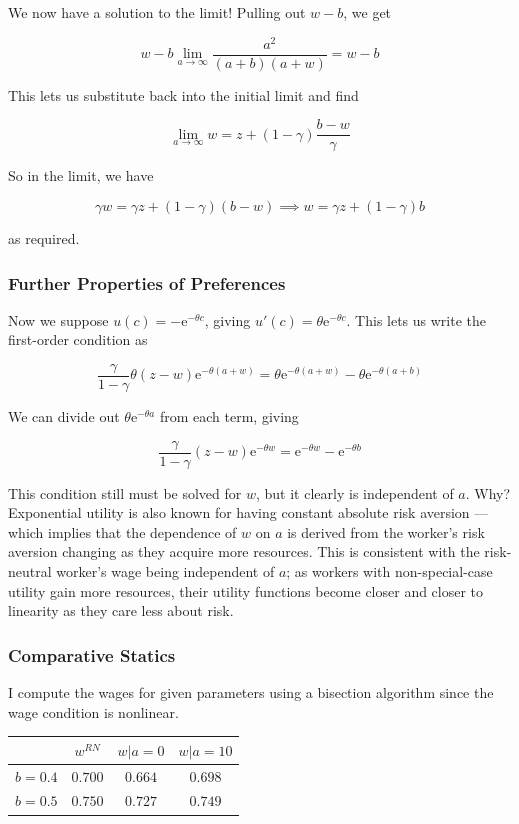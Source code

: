 \documentclass[12pt, letterpaper, parskip = full]{article}
\newcommand{\e}{\mathrm{e}}
\begin{document}
    We now have a solution to the limit! Pulling out \(w - b\), we get

    \[w - b \lim_{a \rightarrow \infty} \frac{a^2}{(a+b)(a+w)} = w - b\]

    This lets us substitute back into the initial limit and find

    \[ \lim_{a \rightarrow \infty} w = z + (1 - \gamma) \frac{b - w}{\gamma} \]

    So in the limit, we have

    \[ \gamma w = \gamma z + (1 - \gamma) (b - w) \implies w = \gamma z + (1 - \gamma) b  \]

    as required.


    \subsubsection{Further Properties of Preferences}

    Now we suppose \(u(c) = -\e^{-\theta c}\), giving \(u'(c) = \theta \e^{-\theta c}\). This lets us write the first-order condition as

    \[  \frac{\gamma}{1 - \gamma} \theta (z - w) \e^{- \theta (a + w)} = \theta \e^{- \theta (a+w)} - \theta \e^{-\theta (a+b)}  \]

    We can divide out \(\theta \e^{-\theta a}\) from each term, giving

    \[ \frac{\gamma}{1 - \gamma} (z - w) \e^{-\theta w} = \e^{-\theta w} - \e^{-\theta b}  \]

    This condition still must be solved for \(w\), but it clearly is independent of \(a\). Why? Exponential utility is also known for having constant absolute risk aversion --- which implies that the dependence of \(w\) on \(a\) is derived from the worker's risk aversion changing as they acquire more resources. This is consistent with the risk-neutral worker's wage being independent of \(a\); as workers with non-special-case utility gain more resources, their utility functions become closer and closer to linearity as they care less about risk.

    \subsubsection{Comparative Statics}

    I compute the wages for given parameters using a bisection algorithm since the wage condition is nonlinear.

    \begin{center}
	\begin{tabular}{|c|c|c|c|}
		\hline
		 & \(w^{RN}\) & \(w | a = 0\) & \(w | a = 10\) \\
		\hline
		\(b = 0.4\) & \(0.700\) & \(0.664\) & \(0.698\) \\
		\hline

        \(b = 0.5\) & \(0.750\) & \(0.727\) & \(0.749\) \\

        \hline
	\end{tabular}
	\end{center}
\end{document}
